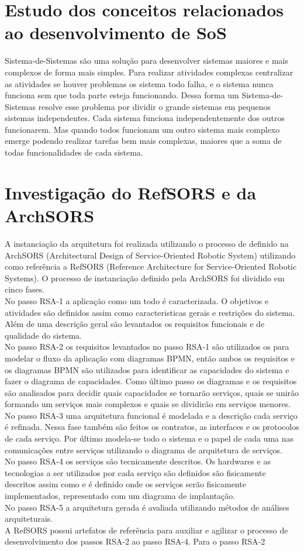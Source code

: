 \documentclass{article}
\begin{document}
\section{Estudo dos conceitos relacionados ao desenvolvimento de SoS}
Sistema-de-Sistemas são uma solução para desenvolver sistemas maiores e mais complexos de forma mais simples. Para realizar atividades complexas centralizar as atividades se houver problemas os sistema todo falha, e o sistema nunca funciona sem que toda parte esteja funcionando. Dessa forma um Sistema-de-Sistemas resolve esse problema por dividir o grande sistemas em pequenos sistemas independentes. Cada sistema funciona independentemente dos outros funcionarem. Mas quando todos funcionam um outro sistema mais complexo emerge podendo realizar tarefas bem mais complexas, maiores que a soma de todas funcionalidades de cada sistema.

\section{Investigação do RefSORS e da ArchSORS}
A instanciação da arquitetura foi realizada utilizando o processo de definido na ArchSORS (Architectural Design of Service-Oriented Robotic System) utilizando como referência a RefSORS (Reference Architecture for Service-Oriented Robotic Systems). O processo de instanciação definido pela ArchSORS foi dividido em cinco fases.\\
	No passo RSA-1 a aplicação como um todo é caracterizada. O objetivos e atividades são definidos assim como caracteristicas gerais e restrições do sistema. Além de uma descrição geral são levantados os requisitos funcionais e de qualidade do sistema.\\
	No passo RSA-2 os requisitos levantados no passo RSA-1 são utilizados os para modelar o fluxo da aplicação com diagramas BPMN, então ambos os requisitos e os diagramas BPMN são utilizados para identificar as capacidades do sistema e fazer o diagrama de capacidades. Como último passo os diagramas e os requisitos são analisados para decidir quais capacidades se tornarão serviços, quais se unirão formando um serviços mais complexos e quais se dividirão em serviços menores.\\
	No passo RSA-3 uma arquitetura funcional é modelada e a descrição cada serviço é refinada. Nessa fase também são feitos os contratos, as interfaces e os protocolos de cada serviço. Por último modela-se todo o sistema e o papel de cada uma nas comunicações entre serviços utilizando o diagrama de arquitetura de serviços.\\
	No passo RSA-4 os serviços são tecnicamente descritos. Os hardwares e as tecnologias a ser utilizados por cada serviço são definidos são fisicamente descritos assim como  e é definido onde os serviços serão fisicamente implementados, representado com um diagrama de implantação.\\
	No passo RSA-5 a arquitetura gerada é avaliada utilizando métodos de análises arquiteturais.\\
A RefSORS possui artefatos de referência para auxiliar e agilizar o processo de desenvolvimento dos passos RSA-2 ao passo RSA-4. Para o passo RSA-2 
\end{document}
